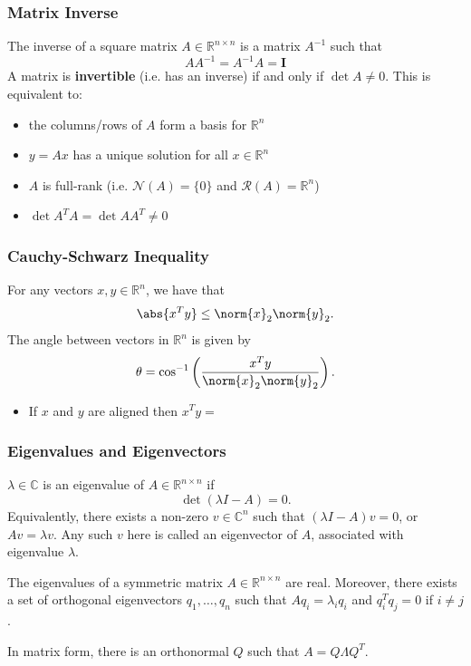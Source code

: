 \documentclass[11pt]{article}
\begin{document}
\subsubsection*{Matrix Inverse} 
The inverse of a square matrix $A \in \mathbb{R}^{n\times n}$ is a matrix $A^{-1}$ such that 
\[ AA^{-1} = A^{-1}A = \bm{I} \] 
A matrix is \textbf{invertible} (i.e. has an inverse) if and only if $\det A \neq 0$. This is equivalent to: 
\begin{itemize}
    \item the columns/rows of $A$ form a basis for $\mathbb{R}^n$
    \item $y = Ax$ has a unique solution for all $x \in \mathbb{R}^n$
    \item $A$ is full-rank (i.e. $\mathcal{N}(A) = \{ 0 \}$ and $\mathcal{R}(A) = \mathbb{R}^n$)
    \item $\det A^TA = \det AA^T \neq 0$
\end{itemize}

\subsubsection*{Cauchy-Schwarz Inequality}
For any vectors $x, y \in \mathbb{R}^n$, we have that 
\[ \abs{x^Ty} \leq \norm{x}_2 \norm{y}_2. \] 
The angle between vectors in $\mathbb{R}^n$ is given by 
\[ \theta = \cos^{-1}\left( \frac{x^Ty}{\norm{x}_2\norm{y}_2} \right). \] 
\begin{itemize}
    \item If $x$ and $y$ are aligned then $x^Ty = $
\end{itemize}

\subsubsection*{Eigenvalues and Eigenvectors}
$\lambda \in \mathbb{C}$ is an eigenvalue of $A \in \mathbb{R}^{n\times n}$ if 
\[ \det(\lambda I - A) = 0. \] 
Equivalently, there exists a non-zero $v \in \mathbb{C}^n$ such that $(\lambda I - A)v = 0$, or $Av = \lambda v$. Any such $v$ here is called an eigenvector of $A$, associated with eigenvalue $\lambda$. \par 
The eigenvalues of a symmetric matrix $A \in \mathbb{R}^{n\times n}$ are real. Moreover, there exists a set of orthogonal eigenvectors $q_1, \ldots, q_n$ such that $Aq_i = \lambda_iq_i$ and $q_i^Tq_j = 0$ if $i \neq j$. \par 
In matrix form, there is an orthonormal $Q$ such that $A = Q\Lambda Q^T$.
\end{document}
